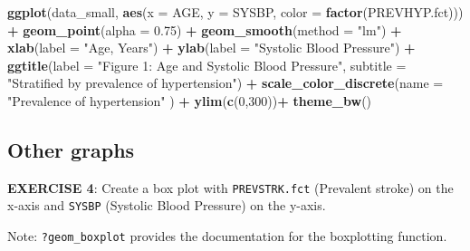 \documentclass[
]{article}
\newenvironment{Shaded}{\begin{snugshade}}{\end{snugshade}}
\newcommand{\CommentTok}[1]{\textcolor[rgb]{0.56,0.35,0.01}{\textit{#1}}}
\newcommand{\DataTypeTok}[1]{\textcolor[rgb]{0.13,0.29,0.53}{#1}}
\newcommand{\DecValTok}[1]{\textcolor[rgb]{0.00,0.00,0.81}{#1}}
\newcommand{\FloatTok}[1]{\textcolor[rgb]{0.00,0.00,0.81}{#1}}
\newcommand{\KeywordTok}[1]{\textcolor[rgb]{0.13,0.29,0.53}{\textbf{#1}}}
\newcommand{\NormalTok}[1]{#1}
\newcommand{\OperatorTok}[1]{\textcolor[rgb]{0.81,0.36,0.00}{\textbf{#1}}}
\newcommand{\StringTok}[1]{\textcolor[rgb]{0.31,0.60,0.02}{#1}}
\begin{document}
\begin{Shaded}
\begin{Highlighting}[]
\KeywordTok{ggplot}\NormalTok{(data_small, }
      \KeywordTok{aes}\NormalTok{(}\DataTypeTok{x =}\NormalTok{ AGE, }\DataTypeTok{y =}\NormalTok{ SYSBP, }\DataTypeTok{color =} \KeywordTok{factor}\NormalTok{(PREVHYP.fct))) }\OperatorTok{+}
\StringTok{  }\KeywordTok{geom_point}\NormalTok{(}\DataTypeTok{alpha =} \FloatTok{0.75}\NormalTok{) }\OperatorTok{+}
\StringTok{  }\KeywordTok{geom_smooth}\NormalTok{(}\DataTypeTok{method =} \StringTok{"lm"}\NormalTok{) }\OperatorTok{+}
\StringTok{  }\KeywordTok{xlab}\NormalTok{(}\DataTypeTok{label =} \StringTok{"Age, Years"}\NormalTok{) }\OperatorTok{+}\StringTok{ }
\StringTok{  }\KeywordTok{ylab}\NormalTok{(}\DataTypeTok{label =} \StringTok{"Systolic Blood Pressure"}\NormalTok{) }\OperatorTok{+}
\StringTok{  }\KeywordTok{ggtitle}\NormalTok{(}\DataTypeTok{label =} \StringTok{"Figure 1: Age and Systolic Blood Pressure"}\NormalTok{, }
          \DataTypeTok{subtitle =} \StringTok{"Stratified by prevalence of hypertension"}\NormalTok{) }\OperatorTok{+}\StringTok{ }
\StringTok{  }\KeywordTok{scale_color_discrete}\NormalTok{(}\DataTypeTok{name =} \StringTok{"Prevalence of hypertension"}\NormalTok{ ) }\OperatorTok{+}\StringTok{ }
\StringTok{  }\KeywordTok{ylim}\NormalTok{(}\KeywordTok{c}\NormalTok{(}\DecValTok{0}\NormalTok{,}\DecValTok{300}\NormalTok{))}\OperatorTok{+}
\StringTok{  }\KeywordTok{theme_bw}\NormalTok{()}
\end{Highlighting}
\end{Shaded}

\hypertarget{other-graphs}{%
\subsection{Other graphs}\label{other-graphs}}

\textbf{EXERCISE 4}: Create a box plot with \texttt{PREVSTRK.fct}
(Prevalent stroke) on the x-axis and \texttt{SYSBP} (Systolic Blood
Pressure) on the y-axis.

Note: \texttt{?geom\_boxplot} provides the documentation for the
boxplotting function.

\begin{Shaded}
\end{Shaded}
\end{document}
